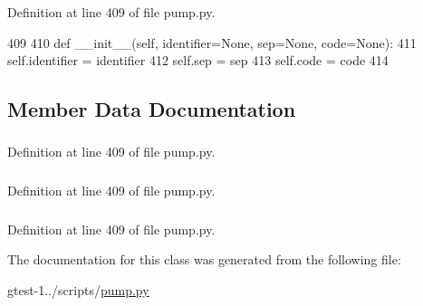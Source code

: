 \-Definition at line 409 of file pump.\-py.


\begin{DoxyCode}
409 
410   def __init__(self, identifier=None, sep=None, code=None):
411     self.identifier = identifier
412     self.sep = sep
413     self.code = code
414 

\end{DoxyCode}


\subsection{\-Member \-Data \-Documentation}
\hypertarget{classpump_1_1ForNode_afb9ed1b8a27eb20854efe6e23e297683}{
\subsubsection[{code}]{}}\label{d4/d92/classpump_1_1ForNode_afb9ed1b8a27eb20854efe6e23e297683}


\-Definition at line 409 of file pump.\-py.

\hypertarget{classpump_1_1ForNode_afc486b0767ef05e2dc12f5b98be72902}{
\subsubsection[{identifier}]{}}\label{d4/d92/classpump_1_1ForNode_afc486b0767ef05e2dc12f5b98be72902}


\-Definition at line 409 of file pump.\-py.

\hypertarget{classpump_1_1ForNode_a46420880a743b84984d25cc134101880}{
\subsubsection[{sep}]{}}\label{d4/d92/classpump_1_1ForNode_a46420880a743b84984d25cc134101880}


\-Definition at line 409 of file pump.\-py.



\-The documentation for this class was generated from the following file\-:\begin{DoxyCompactItemize}
\item 
gtest-\/1../scripts/\hyperlink{pump_8py}{pump.\-py}\end{DoxyCompactItemize}
